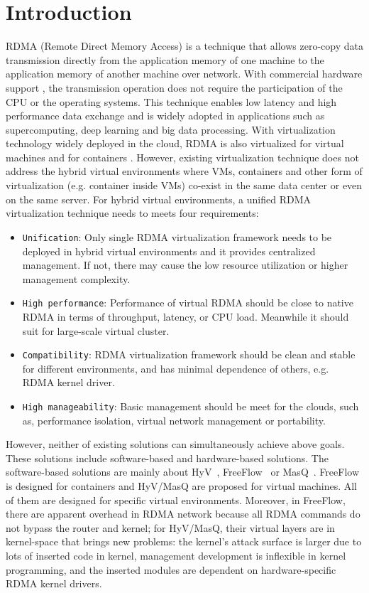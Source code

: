 \section{Introduction}
RDMA (Remote Direct Memory Access) is a technique that allows zero-copy data transmission directly from the application memory of one machine to the application memory of another machine over network. With commercial hardware support \cite{roce, iwarp, infiniband}, the transmission operation does not require the participation of the CPU or the operating systems. This technique enables low latency and high performance data exchange and is widely adopted in applications such as supercomputing, deep learning and big data processing.
With virtualization technology widely deployed in the cloud, RDMA is also virtualized for virtual machines \cite{pfefferle2015hybrid, he2020masq} and for containers \cite{kim2019freeflow}. However, existing virtualization technique does not address the hybrid virtual environments where VMs, containers and other form of virtualization (e.g. container inside VMs) co-exist in the same data center or even on the same server.
For hybrid virtual environments, a unified RDMA virtualization technique needs to meets four requirements:

\begin{itemize}
	\item {\verb|Unification|}: Only single RDMA virtualization framework needs to be deployed in hybrid virtual environments and it provides centralized management. If not, there may cause the low resource utilization or higher management complexity.
	\item {\verb|High performance|}: Performance of virtual RDMA should be close to native RDMA in terms of throughput, latency, or CPU load. Meanwhile it should suit for large-scale virtual cluster.
	\item {\verb|Compatibility|}: RDMA virtualization framework should be clean and stable for different environments, and has minimal dependence of others, e.g. RDMA kernel driver.
	\item {\verb|High manageability|}: Basic management should be meet for the clouds, such as, performance isolation, virtual network management or portability.
\end{itemize}

However, neither of existing solutions can simultaneously achieve above goals. These solutions include software-based and hardware-based solutions. The software-based solutions are mainly about HyV~\cite{pfefferle2015hybrid}, FreeFlow~\cite{kim2019freeflow} or MasQ~\cite{he2020masq}. FreeFlow is  designed for containers and HyV/MasQ are proposed for virtual machines. All of them are designed for specific virtual environments. Moreover, in FreeFlow, there are apparent overhead in RDMA network because all RDMA commands do not bypass the router and kernel; for HyV/MasQ, their virtual layers are in kernel-space that brings new problems: the kernel's attack surface is larger due to lots of inserted code in kernel, management development is inflexible in kernel programming, and the inserted modules are dependent on hardware-specific RDMA kernel drivers.

